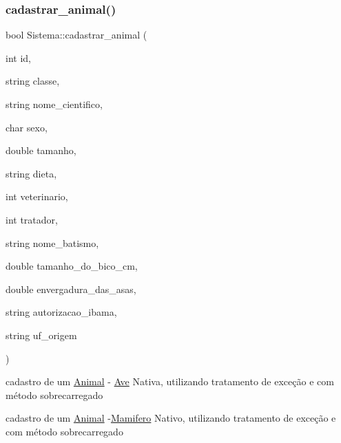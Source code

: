 \subsubsection{\texorpdfstring{cadastrar\_animal()}{cadastrar\_animal()}\hspace{0.1cm}{\footnotesize\ttfamily [5/12]}}
{\footnotesize\ttfamily bool Sistema\+::cadastrar\+\_\+animal (\begin{DoxyParamCaption}\item[{int}]{id,  }\item[{string}]{classe,  }\item[{string}]{nome\+\_\+cientifico,  }\item[{char}]{sexo,  }\item[{double}]{tamanho,  }\item[{string}]{dieta,  }\item[{int}]{veterinario,  }\item[{int}]{tratador,  }\item[{string}]{nome\+\_\+batismo,  }\item[{double}]{tamanho\+\_\+do\+\_\+bico\+\_\+cm,  }\item[{double}]{envergadura\+\_\+das\+\_\+asas,  }\item[{string}]{autorizacao\+\_\+ibama,  }\item[{string}]{uf\+\_\+origem }\end{DoxyParamCaption})}



cadastro de um \mbox{\hyperlink{class_animal}{Animal}} -\/ \mbox{\hyperlink{class_ave}{Ave}} Nativa, utilizando tratamento de exceção e com método sobrecarregado 

cadastro de um \mbox{\hyperlink{class_animal}{Animal}} -\/\mbox{\hyperlink{class_mamifero}{Mamifero}} Nativo, utilizando tratamento de exceção e com método sobrecarregado \mbox{\label{class_sistema_af360ec77152a6b60c5cfe4a4a31deeb6}} 
